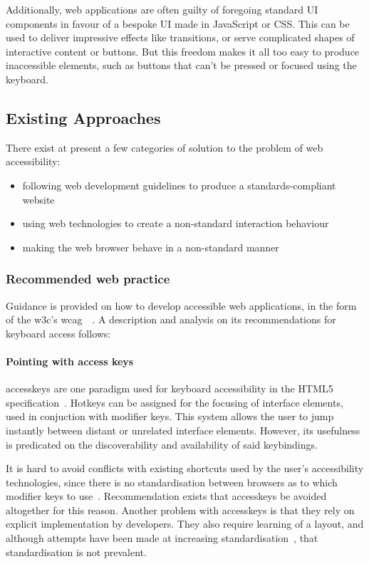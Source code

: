 \documentclass[11pt,openright,a4paper]{report}
\begin{document}
Additionally, web applications are often guilty of foregoing standard UI components in favour of a bespoke UI made in JavaScript or CSS. This can be used to deliver impressive effects like transitions, or serve complicated shapes of interactive content or buttons. But this freedom makes it all too easy to produce inaccessible elements, such as buttons that can't be pressed or focused using the keyboard.

\subsection{Existing Approaches}
There exist at present a few categories of solution to the problem of web accessibility:
\begin{itemize}
\item following web development guidelines to produce a standards-compliant website
\item using web technologies to create a non-standard interaction behaviour
\item making the web browser behave in a non-standard manner
\end{itemize}
\subsubsection{Recommended web practice}
\label{recommendedpracticesection}
Guidance is provided on how to develop accessible web applications, in the form of the \gls{w3c}'s \gls{wcag}~\cite{chisholm2001web}~\cite{wcag}. A description and analysis on its recommendations for keyboard access follows:
\paragraph{Pointing with access keys}
\label{accesskeysection}
  \Gls{accesskeys} are one paradigm used for keyboard accessibility in the HTML5 specification~\cite{html5specaccesskeys}. Hotkeys can be assigned for the focusing of interface elements, used in conjuction with modifier keys. This system allows the user to jump instantly between distant or unrelated interface elements. However, its usefulness is predicated on the discoverability and availability of said \glspl{keybinding}.

  It is hard to avoid conflicts with existing shortcuts used by the user's accessibility technologies, since there is no standardisation between browsers as to which modifier keys to use~\cite{webaimaccesskeys}. Recommendation exists that \gls{accesskeys} be avoided altogether for this reason. Another problem with \gls{accesskeys} is that they rely on explicit implementation by developers. They also require learning of a layout, and although attempts have been made at increasing standardisation~\cite{AccesskeyStandardisation}, that standardisation is not prevalent.
\end{document}
